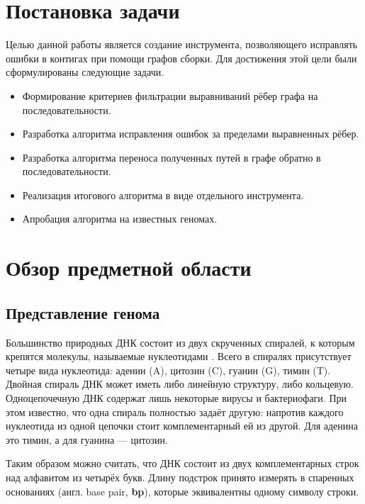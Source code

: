 \documentclass[14pt]{matmex-diploma-custom}
\begin{document}
\section{Постановка задачи}
Целью данной работы является создание инструмента, позволяющего исправлять ошибки в контигах при помощи графов сборки. Для достижения этой цели были сформулированы следующие задачи.
\begin{itemize}
    \item Формирование критериев фильтрации выравниваний рёбер графа на последовательности.
    \item Разработка алгоритма исправления ошибок за пределами выравненных рёбер.
    \item Разработка алгоритма переноса полученных путей в графе обратно в последовательности.
    \item Реализация итогового алгоритма в виде отдельного инструмента.
    \item Апробация алгоритма на известных геномах.
\end{itemize}

\section{Обзор предметной области}
\subsection{Представление генома}
Большинство природных ДНК состоит из двух скрученных спиралей, к которым крепятся молекулы, называемые нуклеотидами \cite{art:Watson}. Всего в спиралях присутствует четыре вида нуклеотида: аденин (A), цитозин (C), гуанин (G), тимин (T). Двойная спираль ДНК может иметь либо линейную структуру, либо кольцевую. Одноцепочечную ДНК содержат лишь некоторые вирусы и бактериофаги. При этом известно, что одна спираль полностью задаёт другую: напротив каждого нуклеотида из одной цепочки стоит комплементарный ей из другой. Для аденина это тимин, а для гуанина --- цитозин.

Таким образом можно считать, что ДНК состоит из двух комплементарных строк над алфавитом из четырёх букв. Длину подстрок принято измерять в спаренных основаниях (англ. base pair, \textbf{bp}), которые эквивалентны одному символу строки.
\end{document}
